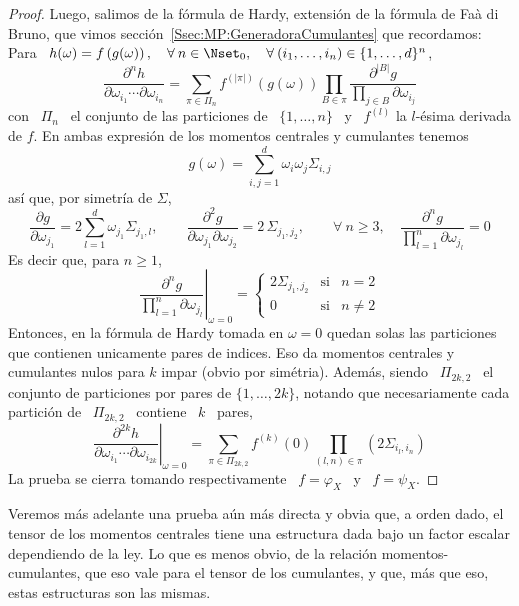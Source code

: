 \begin{proof}
  Luego, salimos de la f\'ormula de  Hardy, extensi\'on de la f\'ormula de Fa\`a
  di   Bruno,   que   vimos   secci\'on~\ref{Ssec:MP:GeneradoraCumulantes}   que
  recordamos: Para \ $h(\omega) =  f\left( g(\omega) \right), \quad \forall \: n
  \in \Nset_0,  \quad \forall \:  (i_1 , \ldots ,  i_n ) \in  \{ 1 , \ldots  , d
  \}^n$,
  \[
  \frac{\partial^n  h}{\partial  \omega_{i_1}  \cdots \partial  \omega_{i_n}}  =
  \sum_{\pi  \in \Pi_n}  f^{(|\pi|)}\left( g(\omega)  \right) \prod_{B  \in \pi}
  \frac{\partial^{|B|} g}{\displaystyle \prod_{j \in B} \partial \omega_{i_j}}
  \]
  con \ $\Pi_n$ \ el conjunto de las particiones de \ $\{ 1 , \ldots , n \}$ \ y
  \ $f^{(l)}$ la $l$-\'esima derivada de $f$.  En ambas expresi\'on de los momentos
  centrales y cumulantes tenemos
  \[
  g(\omega) = \sum_{i,j=1}^d \omega_i \omega_j \Sigma_{i,j}
  \]
  as\'i que, por simetr\'ia de $\Sigma$,
  \[
  \frac{\partial  g}{\partial   \omega_{j_1}}  =  2   \sum_{l=1}^d  \omega_{j_1}
  \Sigma_{j_1,l},  \qquad  \frac{\partial^2  g}{\partial  \omega_{j_1}  \partial
    \omega_{j_2}}  =  2 \, \Sigma_{j_1,j_2},  \qquad  \forall  \:  n \ge  3,  \quad
  \frac{\partial^n g}{\prod_{l=1}^n \partial \omega_{j_l}} = 0
  \]
  Es decir que, para $n \ge 1$,
  \[
  \left.      \frac{\partial^n    g}{\prod_{l=1}^n     \partial    \omega_{j_l}}
  \right|_{\omega = 0} = \left\{\begin{array}{ccl}
  2   \Sigma_{j_1,j_2} & \mbox{si} & n = 2\\[2mm]
  0 & \mbox{si} & n \ne 2
  \end{array}\right.
  \]
  Entonces,  en la f\'ormula  de Hardy  tomada en  $\omega =  0$ quedan  solas las
  particiones  que  contienen unicamente  pares  de  indices.   Eso da  momentos
  centrales y cumulantes nulos para $k$ impar (obvio por sim\'etria). Adem\'as,
  siendo \  $\Pi_{2 k , 2}$  \ el conjunto de  particiones por pares de  $\{ 1 ,
  \ldots , 2 k \}$, notando que necesariamente cada partici\'on de \ $\Pi_{2 k ,
    2}$ \ contiene \ $k$ \ pares,
  \[
  \left.    \frac{\partial^{2  k}   h}{\partial  \omega_{i_1}   \cdots  \partial
      \omega_{i_{2  k}}}\right|_{\omega =  0} =  \sum_{\pi  \in \Pi_{2  k ,  2}}
  f^{(k)}(0) \prod_{(l,n) \in \pi} \left( 2 \Sigma_{i_l,i_n} \right)
  \]
  La prueba  se cierra  tomando respectivamente  \ $f =  \varphi_X$ \  y \  $f =
  \psi_X$.
\end{proof}
%
Veremos m\'as adelante una prueba a\'un m\'as directa y obvia que, a orden dado,
el tensor  de los momentos  centrales tiene una  estructura dada bajo  un factor
escalar  dependiendo  de la  ley.   Lo  que es  menos  obvio,  de la  relaci\'on
momentos-cumulantes, que eso vale para el tensor de los cumulantes, y que, m\'as
que eso, estas estructuras son las mismas.

